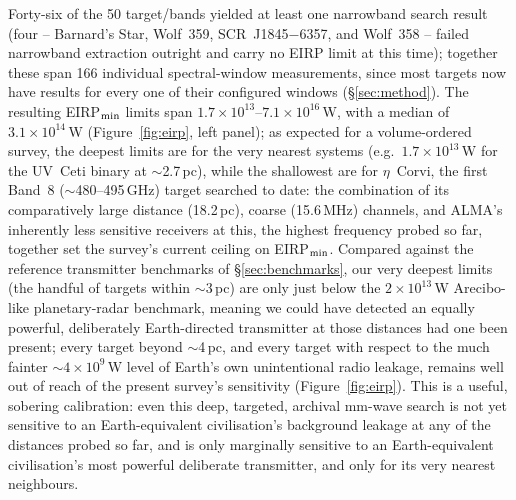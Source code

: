 \documentclass{openjournal}
\begin{document}
Forty-six of the 50 target/bands yielded at least one narrowband search
result (four -- Barnard's Star, Wolf~359, SCR~J1845$-$6357, and
Wolf~358 -- failed narrowband extraction outright and carry no EIRP
limit at this time); together these span 166 individual spectral-window measurements, since
most targets now have results for every one of their configured windows
(\S\ref{sec:method}). The resulting EIRP$_{\rm min}$ limits span
$1.7\times10^{13}$--$7.1\times10^{16}$\,W, with a median of
$3.1\times10^{14}$\,W (Figure~\ref{fig:eirp}, left panel); as expected
for a volume-ordered survey, the deepest limits are for the very nearest
systems (e.g.\ $1.7\times10^{13}$\,W for the UV~Ceti binary at $\sim$2.7\,pc),
while the shallowest are for $\eta$~Corvi, the first Band~8 ($\sim$480--495\,GHz)
target searched to date: the combination of its comparatively large
distance (18.2\,pc), coarse (15.6\,MHz) channels, and ALMA's inherently
less sensitive receivers at this, the highest frequency probed so far,
together set the survey's current ceiling on EIRP$_{\rm min}$.
Compared against the reference transmitter benchmarks of
\S\ref{sec:benchmarks}, our very deepest limits (the handful of targets
within $\sim$3\,pc) are only just below the $2\times10^{13}$\,W
Arecibo-like planetary-radar benchmark, meaning we could have detected an
equally powerful, deliberately Earth-directed transmitter at those
distances had one been present; every target beyond $\sim$4\,pc, and
every target with respect to the much fainter $\sim4\times10^{9}$\,W
level of Earth's own unintentional radio leakage, remains well out of
reach of the present survey's sensitivity (Figure~\ref{fig:eirp}). This
is a useful, sobering calibration: even this deep, targeted, archival
mm-wave search is not yet sensitive to an Earth-equivalent civilisation's
background leakage at any of the distances probed so far, and is only
marginally sensitive to an Earth-equivalent civilisation's most powerful
deliberate transmitter, and only for its very nearest neighbours.
\end{document}
